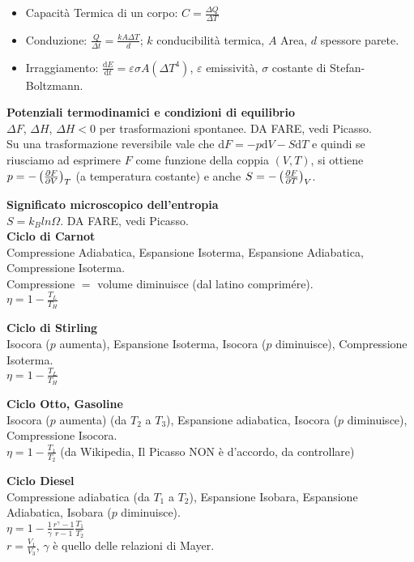 \documentclass[10pt,a4paper]{article}
\newcommand{\de}{{\ensuremath{ \mbox{d}}}}
\newcommand{\dpar}[2]{{\ensuremath{\frac{\partial {#1}}{\partial {#2}}}}}
\begin{document}
\begin{multicols}{2}
  \begin{itemize}
  \item Capacità Termica di un corpo: $C = \frac{\Delta Q}{\Delta T}$
  \item Conduzione: $\frac{Q}{\Delta t} = \frac{k A \Delta T}{d}$; $k$ conducibilit\`a termica, $A$ Area, $d$ spessore parete.
  \item Irraggiamento: $\frac{\de E}{\de t} = \varepsilon \sigma A (\Delta T^4)$, $\varepsilon$ emissivit\`a, $\sigma$ costante di Stefan-Boltzmann.
  \end{itemize}

\textbf{Potenziali termodinamici e condizioni di equilibrio} \\
$\Delta F$, $\Delta H$, $\Delta H < 0$ per trasformazioni spontanee. DA FARE, vedi Picasso. \\

Su una trasformazione reversibile vale che $\de F = - p \de V - S \de T$ e quindi se riusciamo ad esprimere $F$ come funzione della coppia $(V, T)$, si ottiene $p = - \lrb{\dpar{F}{V}}_T$ (a temperatura costante) e anche $S = - \lrb{\dpar{F}{T}}_V$.

\textbf{Significato microscopico dell'entropia} \\
$S=k_B ln \Omega$. DA FARE, vedi Picasso. \\

\textbf{Ciclo di Carnot} \\
Compressione Adiabatica, Espansione Isoterma, Espansione Adiabatica, Compressione Isoterma. \\
Compressione $=$ volume diminuisce (dal latino comprimére). \\
$\eta = 1- \frac{T_L}{T_H}$

\textbf{Ciclo di Stirling} \\
Isocora ($p$ aumenta), Espansione Isoterma, Isocora ($p$ diminuisce), Compressione Isoterma. \\
$\eta = 1- \frac{T_L}{T_H}$

\textbf{Ciclo Otto, Gasoline} \\
Isocora ($p$ aumenta) (da $T_2$ a $T_3$), Espansione adiabatica, Isocora ($p$ diminuisce), Compressione Isocora. \\
$\eta = 1- \frac{T_1}{T_2}$ (da Wikipedia, Il Picasso NON è d'accordo, da controllare)

\textbf{Ciclo Diesel} \\
Compressione adiabatica (da $T_1$ a $T_2$), Espansione Isobara, Espansione Adiabatica, Isobara ($p$ diminuisce). \\
$\eta= 1-\frac{1}{\gamma} \frac{r^\gamma -1}{r-1} \frac{T_1}{T_2}$ \\
$r=\frac{V_1}{V_3}$, $\gamma$ è quello delle relazioni di Mayer.



\end{multicols}
\end{document}
